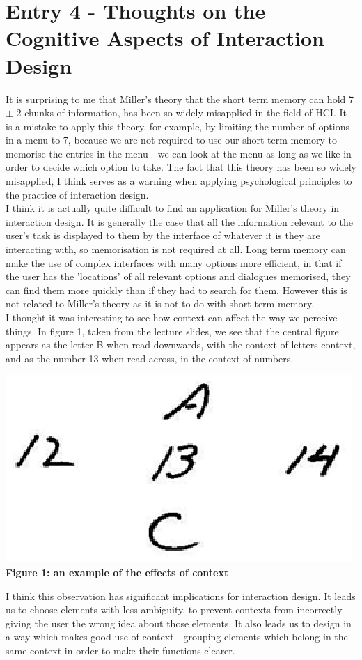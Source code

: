 \documentclass{article}
\begin{document}
\section*{Entry 4 - Thoughts on the Cognitive Aspects of Interaction Design}

\noindent It is surprising to me that Miller's theory that the short term memory can hold 7 $\pm$ 2 chunks of information, has been so widely misapplied in the field of HCI. It is a mistake to apply this theory, for example, by limiting the number of options in a menu to 7, because we are not required to use our short term memory to memorise the entries in the menu - we can look at the menu as long as we like in order to decide which option to take. The fact that this theory has been so widely misapplied, I think serves as a warning when applying psychological principles to the practice of interaction design.
\\\indent I think it is actually quite difficult to find an application for Miller's theory in interaction design. It is generally the case that all the information relevant to the user's task is displayed to them by the interface of whatever it is they are interacting with, so memorisation is not required at all. Long term memory can make the use of complex interfaces with many options more efficient, in that if the user has the 'locations' of all relevant options and dialogues memorised, they can find them more quickly than if they had to search for them. However this is not related to Miller's theory as it is not to do with short-term memory.
\\\indent I thought it was interesting to see how context can affect the way we perceive things. In figure 1, taken from the lecture slides, we see that the central figure appears as the letter B when read downwards, with the context of letters context, and as the number 13 when read across, in the context of numbers.
\\\begin{center}\includegraphics{context}\\\textbf{Figure 1: an example of the effects of context}\end{center}
I think this observation has significant implications for interaction design. It leads us to choose elements with less ambiguity, to prevent contexts from incorrectly giving the user the wrong idea about those elements. It also leads us to design in a way which makes good use of context - grouping elements which belong in the same context in order to make their functions clearer.
\end{document}
